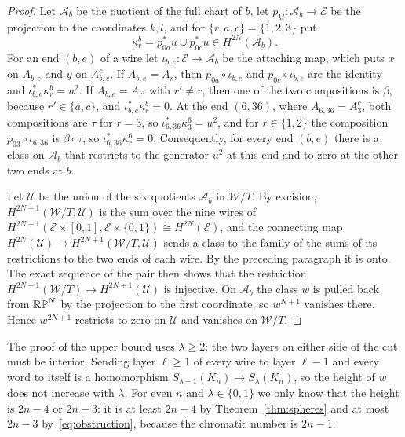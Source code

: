 \begin{proof}
Let $\mathcal A_b$ be the quotient of the full chart of $b$, let $p_{kl}:\mathcal A_b\to\mathcal E$ be the projection to the coordinates $k,l$, and for $\{r,a,c\}=\{1,2,3\}$ put
\[
 \kappa^b_r=p_{0a}^*u\cup p_{0c}^*u\in H^{2N}(\mathcal A_b).
\]
For an end $(b,e)$ of a wire let $\iota_{b,e}:\mathcal E\to\mathcal A_b$ be the attaching map, which puts $x$ on $A_{b,e}$ and $y$ on $A_{b,e}^c$. If $A_{b,e}=A_r$, then $p_{0a}\circ\iota_{b,e}$ and $p_{0c}\circ\iota_{b,e}$ are the identity and $\iota_{b,e}^*\kappa^b_r=u^2$. If $A_{b,e}=A_{r'}$ with $r'\ne r$, then one of the two compositions is $\beta$, because $r'\in\{a,c\}$, and $\iota_{b,e}^*\kappa^b_r=0$. At the end $(6,36)$, where $A_{6,36}=A_3^c$, both compositions are $\tau$ for $r=3$, so $\iota_{6,36}^*\kappa^6_3=u^2$, and for $r\in\{1,2\}$ the composition $p_{03}\circ\iota_{6,36}$ is $\beta\circ\tau$, so $\iota_{6,36}^*\kappa^6_r=0$. Consequently, for every end $(b,e)$ there is a class on $\mathcal A_b$ that restricts to the generator $u^2$ at this end and to zero at the other two ends at $b$.

Let $\mathcal U$ be the union of the six quotients $\mathcal A_b$ in $\mathcal W/T$. By excision, $H^{2N+1}(\mathcal W/T,\mathcal U)$ is the sum over the nine wires of $H^{2N+1}(\mathcal E\times[0,1],\mathcal E\times\{0,1\})\cong H^{2N}(\mathcal E)$, and the connecting map $H^{2N}(\mathcal U)\to H^{2N+1}(\mathcal W/T,\mathcal U)$ sends a class to the family of the sums of its restrictions to the two ends of each wire. By the preceding paragraph it is onto. The exact sequence of the pair then shows that the restriction $H^{2N+1}(\mathcal W/T)\to H^{2N+1}(\mathcal U)$ is injective. On $\mathcal A_b$ the class $w$ is pulled back from $\mathbb{RP}^N$ by the projection to the first coordinate, so $w^{N+1}$ vanishes there. Hence $w^{2N+1}$ restricts to zero on $\mathcal U$ and vanishes on $\mathcal W/T$.
\end{proof}

\begin{remark}\label{rem:short-wires}
The proof of the upper bound uses $\lambda\ge2$: the two layers on either side of the cut must be interior. Sending layer $\ell\ge1$ of every wire to layer $\ell-1$ and every word to itself is a homomorphism $S_{\lambda+1}(K_n)\to S_\lambda(K_n)$, so the height of $w$ does not increase with $\lambda$. For even $n$ and $\lambda\in\{0,1\}$ we only know that the height is $2n-4$ or $2n-3$: it is at least $2n-4$ by Theorem~\ref{thm:spheres} and at most $2n-3$ by~\eqref{eq:obstruction}, because the chromatic number is $2n-1$.
\end{remark}
